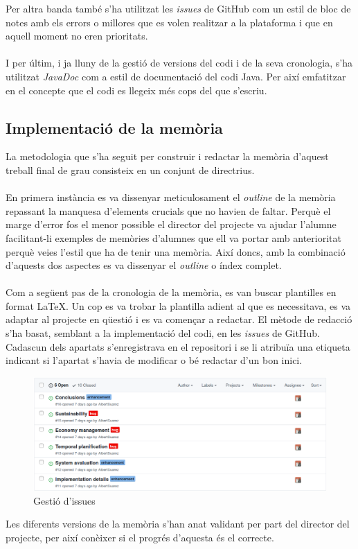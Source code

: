 \noindent Per altra banda també s'ha utilitzat les \textit{issues} de GitHub com un estil de bloc de notes amb els errors o millores que es volen realitzar a la plataforma i que en aquell moment no eren prioritats.
\\\\
I per últim, i ja lluny de la gestió de versions del codi i de la seva cronologia, s'ha utilitzat \textit{JavaDoc} com a estil de documentació del codi Java. Per així emfatitzar en el concepte que el codi es llegeix més cops del que s'escriu.

\subsection{Implementació de la memòria}

La metodologia que s'ha seguit per construir i redactar la memòria d'aquest treball final de grau consisteix en un conjunt de directrius.
\\\\
En primera instància es va dissenyar meticulosament el \textit{outline} de la memòria repassant la manquesa d'elements crucials que no havien de faltar. Perquè el marge d'error fos el menor possible el director del projecte va ajudar l'alumne facilitant-li exemples de memòries d'alumnes que ell va portar amb anterioritat perquè veies l'estil que ha de tenir una memòria. Així doncs, amb la combinació d'aquests dos aspectes es va dissenyar el \textit{outline} o índex complet.
\\\\
Com a següent pas de la cronologia de la memòria, es van buscar plantilles en format \LaTeX. Un cop es va trobar la plantilla adient al que es necessitava, es va adaptar al projecte en qüestió i es va començar a redactar. El mètode de redacció s'ha basat, semblant a la implementació del codi, en les \textit{issues} de GitHub. Cadascun dels apartats s'enregistrava en el repositori i se li atribuïa una etiqueta indicant si l'apartat s'havia de modificar o bé redactar d'un bon inici.
\\
\begin{figure}[H]
\includegraphics[scale=0.375]{Figures/issues.png}
\caption{Gestió d'issues}
\end{figure}

\noindent Les diferents versions de la memòria s'han anat validant per part del director del projecte, per així conèixer si el progrés d'aquesta és el correcte.